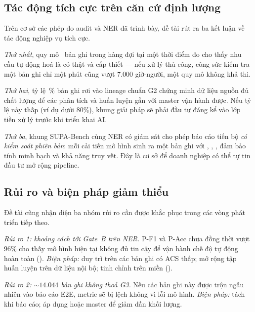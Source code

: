 \subsection{Tác động tích cực trên căn cứ định lượng}
\label{sec:exp-business-positive}

Trên cơ sở các phép đo audit và NER đã trình bày, đề tài rút ra ba kết luận về tác động nghiệp vụ tích cực.

\emph{Thứ nhất}, quy mô \VNAIGENAuditQueueTotal\, bản ghi trong hàng đợi tại một thời điểm đo cho thấy nhu cầu tự động hoá là có thật và cấp thiết --- nếu xử lý thủ công, công sức kiểm tra một bản ghi chỉ một phút cũng vượt \(7.000\) giờ-người, một quy mô không khả thi.

\emph{Thứ hai}, tỷ lệ \VNAIGENAuditGTwoPct\,\% bản ghi rơi vào lineage chuẩn G2 chứng minh dữ liệu nguồn đủ chất lượng để các phân tích và huấn luyện gắn với master vận hành được. Nếu tỷ lệ này thấp (ví dụ dưới \(80\%\)), khung giải pháp sẽ phải đầu tư đáng kể vào lớp tiền xử lý trước khi triển khai AI.

\emph{Thứ ba}, khung SUPA-Bench cùng NER có giám sát cho phép báo cáo tiến bộ \emph{có kiểm soát phiên bản}: mỗi cải tiến mô hình sinh ra một bản ghi  với , , , đảm bảo tính minh bạch và khả năng truy vết. Đây là cơ sở để doanh nghiệp có thể tự tin đầu tư mở rộng pipeline.

\subsection{Rủi ro và biện pháp giảm thiểu}
\label{sec:exp-business-risks}

Đề tài cũng nhận diện ba nhóm rủi ro cần được khắc phục trong các vòng phát triển tiếp theo.

\emph{Rủi ro 1: khoảng cách tới Gate~B trên NER.} P-F1 và P-Acc chưa đồng thời vượt \(96\%\) cho thấy mô hình hiện tại không đủ tin cậy để vận hành chế độ tự động hoàn toàn (). \emph{Biện pháp:} duy trì  trên các bản ghi có ACS thấp; mở rộng tập huấn luyện trên dữ liệu nội bộ; tinh chỉnh trên miền ().

\emph{Rủi ro 2: \(\sim 14{.}044\) bản ghi không thoả G3.} Nếu các bản ghi này được trộn ngẫu nhiên vào báo cáo E2E, metric sẽ bị lệch không vì lỗi mô hình. \emph{Biện pháp:} tách  khi báo cáo; áp dụng  hoặc  master để giảm dần khối lượng.

